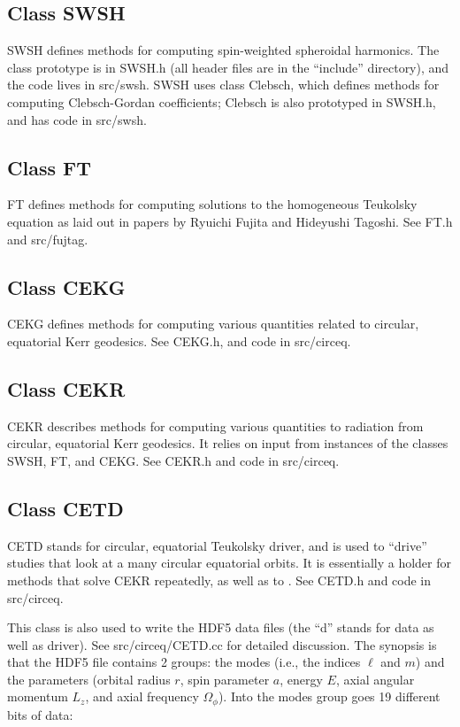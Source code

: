 \documentclass[11pt]{article}
\begin{document}
\subsection{Class SWSH}

SWSH defines methods for computing spin-weighted spheroidal harmonics.  The class prototype is in SWSH.h (all header files are in the ``include'' directory), and the code lives in src/swsh.  SWSH uses class Clebsch, which defines methods for computing Clebsch-Gordan coefficients; Clebsch is also prototyped in SWSH.h, and has code in src/swsh.

\subsection{Class FT}

FT defines methods for computing solutions to the homogeneous Teukolsky equation as laid out in papers by Ryuichi Fujita and Hideyushi Tagoshi.  See FT.h and src/fujtag.

\subsection{Class CEKG}

CEKG defines methods for computing various quantities related to circular, equatorial Kerr geodesics.  See CEKG.h, and code in src/circeq.

\subsection{Class CEKR}

CEKR describes methods for computing various quantities to radiation from circular, equatorial Kerr geodesics.  It relies on input from instances of the classes SWSH, FT, and CEKG.  See CEKR.h and code in src/circeq.

\subsection{Class CETD}

CETD stands for circular, equatorial Teukolsky driver, and is used to ``drive'' studies that look at a many circular equatorial orbits.  It is essentially a holder for methods that solve CEKR repeatedly, as well as to .  See CETD.h and code in src/circeq.

This class is also used to write the HDF5 data files (the ``d'' stands for data as well as driver).  See src/circeq/CETD.cc for detailed discussion.  The synopsis is that the HDF5 file contains 2 groups: the modes (i.e., the indices $\ell$ and $m$) and the parameters (orbital radius $r$, spin parameter $a$, energy $E$, axial angular momentum $L_z$, and axial frequency $\Omega_\phi$).  Into the modes group goes 19 different bits of data:
\end{document}
